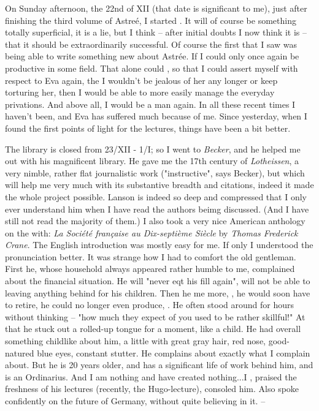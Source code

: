 On Sunday afternoon, the 22nd of XII (that date is significant to me), just after finishing the third volume of Astreé, I started . It will of course be something totally superficial, it is a lie, but I think -- after initial doubts I now think it is -- that it should be extraordinarily successful. Of course the first that I saw was being able to write something new about Astrée. If I could only once again be productive in some field. That alone could , so that I could assert myself with respect to Eva again, the I wouldn't be jealous of her any longer or keep torturing her, then I would be able to more easily manage the everyday privations. And above all, I would be a man again. In all these recent times I haven't been, and Eva has suffered much because of me. Since yesterday, when I found the first points of light for the lectures, things have been a bit better.

The library is closed from 23/XII - 1/I; so I went to \textit{Becker}, and he helped me out with his magnificent library. He gave me the 17th century of \textit{Lotheissen}, a very nimble, rather flat journalistic work ("instructive", says Becker), but which will help me very much with its substantive breadth and citations, indeed it made the whole project possible. Lanson is indeed so deep and compressed that I only ever understand him when I have read the authors beimg discussed. (And I have still not read the majority of them.) I also took a very nice American anthology on the  with: \textit{La Société française au Dix-septième Siècle} by \textit{Thomas Frederick Crane}. The English introduction was mostly easy for me. If only I understood the pronunciation better. It was strange how I had to comfort the old gentleman. First he, whose household always appeared rather humble to me, complained about the financial situation. He will "never eqt his fill again", will not be able to leaving anything behind for his children. Then he  me more, , he would soon have to retire, he could no longer even produce, . He often stood around for hours without thinking -- "how much they expect of you used to be rather skillful!" At that he stuck out a rolled-up tongue for a moment, like a child. He had overall something childlike about him, a little  with great gray hair, red nose, good-natured blue eyes, constant stutter. He complains about exactly what I complain about. But he is 20 years older, and has a significant life of work behind him, and is an Ordinarius. And I am nothing and have created nothing...I , praised the freshness of his lectures (recently, the Hugo-lecture), consoled him. Also spoke confidently on the future of Germany, without quite believing in it. --


